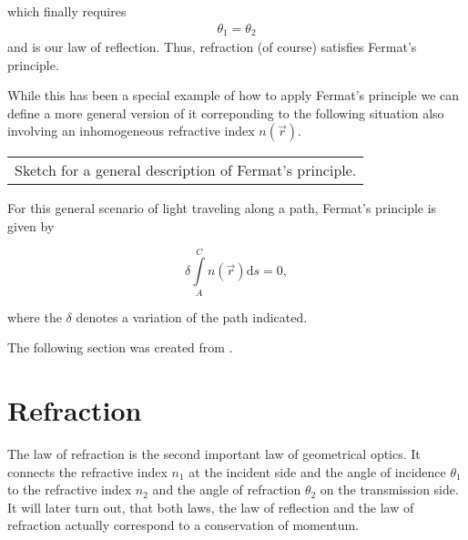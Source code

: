 \documentclass[letterpaper,10pt,english]{sphinxmanual}
\begin{document}
which finally requires
\begin{equation*}
\begin{split}\theta_1=\theta_2\end{split}
\end{equation*}
and is our law of reflection. Thus, refraction (of course) satisfies Fermat’s principle.

While this has been a special example of how to apply Fermat’s principle we can define a more general version of it correponding to the following situation also involving an inhomogeneous refractive index \(n(\vec{r})\).


\begin{savenotes}\sphinxattablestart
\centering
\begin{tabulary}{\linewidth}[t]{|T|}
\hline
\sphinxstyletheadfamily 
{}
\\
\hline
{} Sketch for a general description of Fermat’s principle.
\\
\hline
\end{tabulary}
\par
\sphinxattableend\end{savenotes}

For this general scenario of light traveling along a path, Fermat’s principle is given by

\begin{equation}
\delta \int\limits_{A}^{C} n(\vec{r}) \mathrm ds=0,
\end{equation}

where the \(\delta\) denotes a variation of the path indicated.

The following section was created from .


\section{Refraction}
\label{\detokenize{notebooks/L1/Refraction:Refraction}}\label{\detokenize{notebooks/L1/Refraction::doc}}
The law of refraction is the second important law of geometrical optics. It connects the refractive index \(n_1\) at the incident side and the angle of incidence \(\theta_1\) to the refractive index \(n_2\) and the angle of refraction \(\theta_2\) on the transmission side. It will later turn out, that both laws, the law of reflection and the law of refraction actually correspond to a conservation of momentum.
\end{document}
